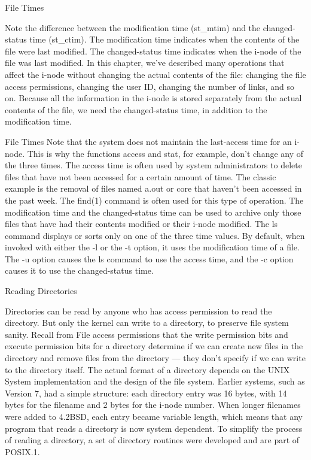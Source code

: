 \documentclass{beamer}
\begin{document}
\begin{frame}[t]{File Times}

Note the difference between the modification time (st\_mtim) and the changed-status
time (st\_ctim). The modification time indicates when the contents of the file were last
modified. The changed-status time indicates when the i-node of the file was last
modified. In this chapter, we’ve described many operations that affect the i-node
without changing the actual contents of the file: changing the file access permissions,
changing the user ID, changing the number of links, and so on. Because all the
information in the i-node is stored separately from the actual contents of the file, we
need the changed-status time, in addition to the modification time.
\end{frame}
\begin{frame}[t]{File Times}
Note that the system does not maintain the last-access time for an i-node. This is
why the functions access and stat, for example, don’t change any of the three times.
The access time is often used by system administrators to delete files that have not
been accessed for a certain amount of time. The classic example is the removal of files
named a.out or core that haven’t been accessed in the past week. The find(1)
command is often used for this type of operation.
The modification time and the changed-status time can be used to archive only
those files that have had their contents modified or their i-node modified.
The ls command displays or sorts only on one of the three time values. By default,
when invoked with either the -l or the -t option, it uses the modification time of a file.
The -u option causes the ls command to use the access time, and the -c option causes
it to use the changed-status time.

\end{frame}
\begin{frame}[t]{Reading Directories}

Directories can be read by anyone who has access permission to read the directory. But
only the kernel can write to a directory, to preserve file system sanity. Recall from
File access permissions that the write permission bits and execute permission bits for a directory
determine if we can create new files in the directory and remove files from the
directory — they don’t specify if we can write to the directory itself.
The actual format of a directory depends on the UNIX System implementation and
the design of the file system. Earlier systems, such as Version 7, had a simple structure:
each directory entry was 16 bytes, with 14 bytes for the filename and 2 bytes for the
i-node number. When longer filenames were added to 4.2BSD, each entry became
variable length, which means that any program that reads a directory is now system
dependent. To simplify the process of reading a directory, a set of directory routines
were developed and are part of POSIX.1.
\end{frame}
\end{document}
